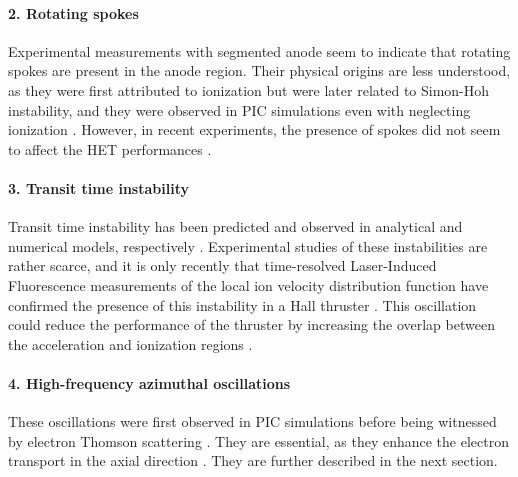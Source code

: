   \paragraph{2. Rotating spokes\\}
  Experimental measurements with segmented anode \citep{ellison2012,mcdonald2011} seem to indicate that rotating spokes are present in the anode region.
  Their physical origins are less understood, as they were first attributed to ionization \citep{janes1966} but were later related to Simon-Hoh instability, and they were observed in \ac{PIC} simulations even with neglecting ionization \citep{carlsson2018}.
  However, in recent experiments, the presence of spokes did not seem to affect the \ac{HET} performances \citep{boeuf2017}.

  \paragraph{3. Transit time instability\\}
  Transit time instability has been predicted and observed in analytical and numerical models, respectively \citep{barral2005,boeuf2018}.
  Experimental studies of these instabilities are rather scarce, and it is only recently that time-resolved Laser-Induced Fluorescence measurements of the local ion velocity distribution function have confirmed the presence of this instability in a Hall thruster \citep{vaudolon2015}.
  This oscillation could reduce the performance of the thruster by increasing the overlap between the acceleration and ionization regions \citep{boeuf2018}.

  \paragraph{4. High-frequency azimuthal oscillations\\}
  These oscillations were first observed in \ac{PIC} simulations \citep{adam2004,ducrocq2006,adam2008a,heron2013} before being witnessed by electron Thomson scattering \citep{tsikata2009a,tsikata2009,tsikata2013}.
  They are essential, as they enhance the electron transport in the axial direction \citep{adam2004,lafleur2016a}.
  They are further described in the next section.
